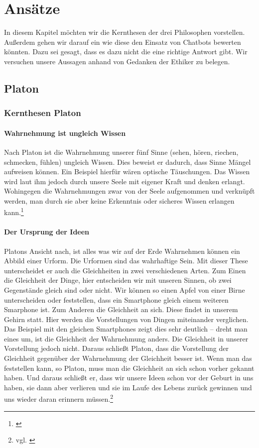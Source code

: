 \section{Ansätze}
In diesem Kapitel möchten wir die Kernthesen der drei Philosophen vorstellen. Außerdem gehen wir darauf ein wie diese den Einsatz von Chatbots bewerten könnten. Dazu sei gesagt, dass es dazu nicht die eine richtige Antwort gibt. Wir versuchen unsere Aussagen anhand von Gedanken der Ethiker zu belegen. 

\subsection{Platon}

\subsubsection{Kernthesen Platon}

\paragraph{Wahrnehmung ist ungleich Wissen} 
Nach Platon ist die Wahrnehmung unserer fünf Sinne (sehen, hören, riechen, schmecken, fühlen) ungleich Wissen. Dies beweist er dadurch, dass Sinne Mängel aufweisen können. Ein Beispiel hierfür wären optische Täuschungen. Das Wissen wird laut ihm jedoch durch unsere Seele mit eigener Kraft und denken erlangt. Wohingegen die Wahrnehmungen zwar von der Seele aufgenommen und verknüpft werden, man durch sie aber keine Erkenntnis oder sicheres Wissen erlangen kann.\footnote{\cite{Platon5}}

\paragraph{Der Ursprung der Ideen}
Platons Ansicht nach, ist alles was wir auf der Erde Wahrnehmen können ein Abbild einer Urform. Die Urformen sind das wahrhaftige Sein. Mit dieser These unterscheidet er auch die Gleichheiten in zwei verschiedenen Arten.
Zum Einen die Gleichheit der Dinge, hier entscheiden wir mit unseren Sinnen, ob zwei Gegenstände gleich sind oder nicht. Wir können so einen Apfel von einer Birne unterscheiden oder feststellen, dass ein Smartphone gleich einem weiteren Smarphone ist.
Zum Anderen die Gleichheit an sich. Diese findet in unserem Gehirn statt. 
Hier werden die Vorstellungen von Dingen miteinander verglichen.
Das Beispiel mit den gleichen Smartphones zeigt dies sehr deutlich -- dreht man eines um, ist die Gleichheit der Wahrnehmung anders. Die Gleichheit in unserer Vorstellung jedoch nicht. Daraus schließt Platon, dass die Vorstellung der Gleichheit gegenüber der Wahrnehmung der Gleichheit besser ist. Wenn man das feststellen kann, so Platon, muss man die Gleichheit an sich schon vorher gekannt haben. Und daraus schließt er, dass wir unsere Ideen schon vor der Geburt in uns haben, sie dann aber verlieren und sie im Laufe des Lebens zurück gewinnen und uns wieder daran erinnern müssen.\footnote{vgl. \cite{Platon3}}


